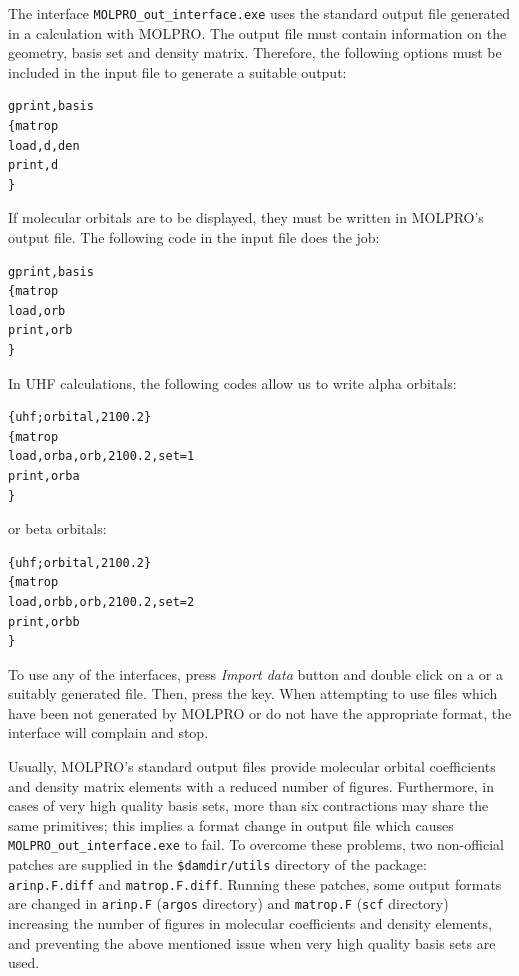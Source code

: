 \documentclass[10pt]{article}
\begin{document}
The interface \texttt{MOLPRO\_out\_interface.exe} uses the standard output file 
generated in a calculation with MOLPRO. The output file must contain information on the
geometry, basis set and density matrix. Therefore, the following options must
be included in the input file to generate a suitable output:
\begin{verbatim}
gprint,basis
{matrop
load,d,den 
print,d
} 
\end{verbatim}

If molecular orbitals are to be displayed, they must be written in MOLPRO's
output file. The following code in the input file does the job:
\begin{verbatim}
gprint,basis
{matrop
load,orb 
print,orb
} 
\end{verbatim}

In UHF calculations, the following codes allow us to write alpha orbitals:

\begin{verbatim}
{uhf;orbital,2100.2}
{matrop
load,orba,orb,2100.2,set=1
print,orba
}
\end{verbatim}

or beta orbitals:

\begin{verbatim}
{uhf;orbital,2100.2}
{matrop
load,orbb,orb,2100.2,set=2
print,orbb
} 
\end{verbatim}

To use any of the interfaces, press {\it Import data} button \teclapuntos and double 
click on a \out{ } or a suitably generated \xml{ } file. Then, press the \exec key. 
When attempting to use files which have been not generated by MOLPRO or do not have 
the appropriate format, the interface will complain and stop.

Usually, MOLPRO's standard output files provide molecular orbital coefficients and 
density matrix elements with a reduced number of figures. Furthermore, in cases of very 
high quality basis sets, more than six contractions may share the same primitives; 
this implies a format change in output file which causes 
\texttt{MOLPRO\_out\_interface.exe} to fail. To overcome these problems, two non-official 
patches are supplied in the \texttt{\$damdir/utils} directory of the package: 
\texttt{arinp.F.diff} and \texttt{matrop.F.diff}. Running these patches, some output 
formats are changed in \texttt{arinp.F} (\texttt{argos} directory) and \texttt{matrop.F} 
(\texttt{scf} directory) increasing the number of figures in molecular coefficients 
and density elements, and preventing the above mentioned 
issue when very high quality basis sets are used.
\end{document}
